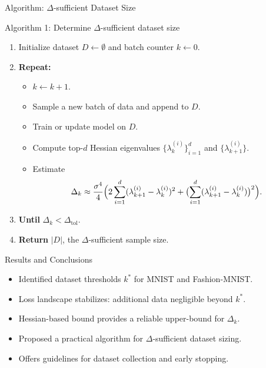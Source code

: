 \documentclass{beamer}
\begin{document}
\begin{frame}{Algorithm: \(\Delta\)-sufficient Dataset Size}
    \begin{block}{Algorithm 1: Determine \(\Delta\)-sufficient dataset size}
        \begin{enumerate}
            \item Initialize dataset \(D \gets \emptyset\) and batch counter \(k \gets 0\).
            \item \textbf{Repeat:}
                  \begin{itemize}
                      \item \(k \gets k + 1\).
                      \item Sample a new batch of data and append to \(D\).
                      \item Train or update model on \(D\).
                      \item Compute top-\(d\) Hessian eigenvalues \(\{\lambda_k^{(i)}\}_{i=1}^d\) and \(\{\lambda_{k+1}^{(i)}\}\).
                      \item Estimate
                            \[
                                \Delta_k \approx \frac{\sigma^4}{4}\Bigl(2\sum_{i=1}^d(\lambda_{k+1}^{(i)}-\lambda_k^{(i)})^2
                                + \bigl(\sum_{i=1}^d(\lambda_{k+1}^{(i)}-\lambda_k^{(i)})\bigr)^2\Bigr).
                            \]
                  \end{itemize}
            \item \textbf{Until} \(\Delta_k < \Delta_{\text{tol}}\).
            \item \textbf{Return} \(|D|\), the \(\Delta\)-sufficient sample size.
        \end{enumerate}
    \end{block}
\end{frame}

\begin{frame}{Results and Conclusions}
    \begin{itemize}
        \item Identified dataset thresholds \(k^*\) for MNIST and Fashion-MNIST.
        \item Loss landscape stabilizes: additional data negligible beyond \(k^*\).
        \item Hessian-based bound provides a reliable upper-bound for \(\Delta_k\).
        \item Proposed a practical algorithm for \(\Delta\)-sufficient dataset sizing.
        \item Offers guidelines for dataset collection and early stopping.
    \end{itemize}
\end{frame}
\end{document}
